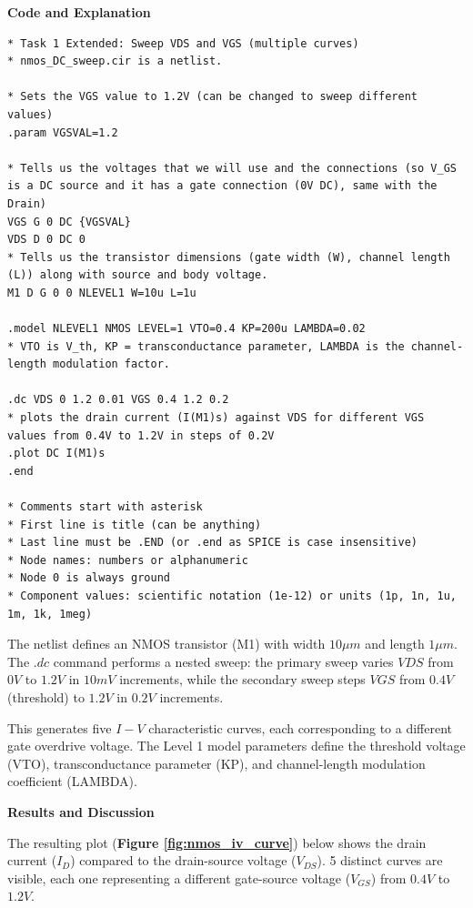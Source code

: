 \documentclass[a4paper,12pt]{article}
\begin{document}
\textbf{Code and Explanation}

\begin{lstlisting}[caption=NMOS Sweep Simulation Code, label=lst:nmos_sweep]
* Task 1 Extended: Sweep VDS and VGS (multiple curves)
* nmos_DC_sweep.cir is a netlist.

* Sets the VGS value to 1.2V (can be changed to sweep different values)
.param VGSVAL=1.2 

* Tells us the voltages that we will use and the connections (so V_GS is a DC source and it has a gate connection (0V DC), same with the Drain)
VGS G 0 DC {VGSVAL}
VDS D 0 DC 0
* Tells us the transistor dimensions (gate width (W), channel length (L)) along with source and body voltage.
M1 D G 0 0 NLEVEL1 W=10u L=1u

.model NLEVEL1 NMOS LEVEL=1 VTO=0.4 KP=200u LAMBDA=0.02
* VTO is V_th, KP = transconductance parameter, LAMBDA is the channel-length modulation factor.

.dc VDS 0 1.2 0.01 VGS 0.4 1.2 0.2
* plots the drain current (I(M1)s) against VDS for different VGS values from 0.4V to 1.2V in steps of 0.2V
.plot DC I(M1)s 
.end

* Comments start with asterisk
* First line is title (can be anything)
* Last line must be .END (or .end as SPICE is case insensitive)
* Node names: numbers or alphanumeric
* Node 0 is always ground
* Component values: scientific notation (1e-12) or units (1p, 1n, 1u, 1m, 1k, 1meg)
\end{lstlisting}

The netlist defines an NMOS transistor (M1) with width $10\mu m$ and length $1\mu m$. 
The $.dc$ command performs a nested sweep: the primary sweep varies $VDS$ from $0V$ to $1.2V$ in $10mV$ increments, while the secondary sweep steps $VGS$ from $0.4V$ (threshold) to $1.2V$ in $0.2V$ increments. 

This generates five $I-V$ characteristic curves, each corresponding to a different gate overdrive voltage. 
The Level 1 model parameters define the threshold voltage (VTO), transconductance parameter (KP), and channel-length modulation coefficient (LAMBDA).

\textbf{Results and Discussion}

The resulting plot (\textbf{Figure \ref{fig:nmos_iv_curve}}) below shows the drain current ($I_D$) compared to the drain-source voltage ($V_{DS}$). 5 distinct curves are visible, each one representing a different gate-source voltage ($V_{GS}$) from $0.4V$ to $1.2V$.
\end{document}

